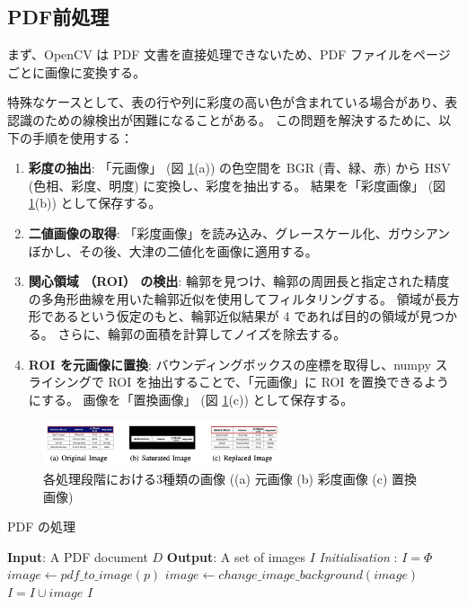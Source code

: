 \documentclass[uplatex, twocolumn,10pt]{jsarticle}
\begin{document}
\subsection{PDF前処理}
まず、OpenCV は PDF 文書を直接処理できないため、PDF ファイルをページごとに画像に変換する。

特殊なケースとして、表の行や列に彩度の高い色が含まれている場合があり、表認識のための線検出が困難になることがある。
この問題を解決するために、以下の手順を使用する：

\begin{enumerate}
    \item \textbf{彩度の抽出}:
    「元画像」 (図 \ref{fig2}(a)) の色空間を BGR (青、緑、赤) から HSV (色相、彩度、明度) に変換し、彩度を抽出する。
    結果を「彩度画像」 (図 \ref{fig2}(b)) として保存する。
    \item \textbf{二値画像の取得}:
    「彩度画像」を読み込み、グレースケール化、ガウシアンぼかし、その後、大津の二値化を画像に適用する。
    \item \textbf{関心領域 （ROI） の検出}:
    輪郭を見つけ、輪郭の周囲長と指定された精度の多角形曲線を用いた輪郭近似を使用してフィルタリングする。
    領域が長方形であるという仮定のもと、輪郭近似結果が 4 であれば目的の領域が見つかる。
    さらに、輪郭の面積を計算してノイズを除去する。
    \item \textbf{ROI を元画像に置換}:
    バウンディングボックスの座標を取得し、numpy スライシングで ROI を抽出することで、「元画像」に ROI を置換できるようにする。
    画像を「置換画像」 (図 \ref{fig2}(c)) として保存する。
\end{enumerate}

\begin{figure}[tp]
    \begin{center}
        \includegraphics*[width=7cm]{image/master/master2/Fig2.png}
        \caption{各処理段階における3種類の画像 ((a) 元画像 (b) 彩度画像 (c) 置換画像)}
        \label{fig2}
    \end{center}
\end{figure}

%
%
%
%
%
%
%
%
%
%
\begin{algorithm}
    \caption{PDF の処理}
    \begin{algorithmic}
    \STATE \textbf{Input}: A PDF document $D$
    \STATE \textbf{Output}: A set of images $I$
    \STATE \textit{Initialisation} : $I = \Phi$
        \STATE $image \leftarrow pdf\_to\_image(p)$
            \STATE $image \leftarrow change\_image\_background(image)$
        \ENDIF
        \STATE $I = I \cup image$
    \ENDFOR
    \RETURN $I$
    \end{algorithmic}
\end{algorithm}
\end{document}
